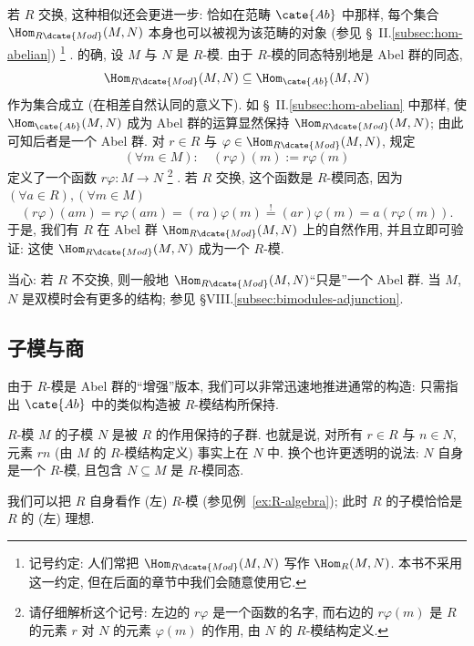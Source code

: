 若 $R$ 交换, 这种相似还会更进一步: 恰如在范畴 $\cate{Ab}$ 中那样, 每个集合 $\Hom_{R\dcate{Mod}}(M, N)$ 本身也可以被视为该范畴的对象 (参见 \S~II.\ref{subsec:hom-abelian})%
\footnote{记号约定: 人们常把 $\Hom_{R\dcate{Mod}}(M, N)$ 写作 $\Hom_R(M, N)$. 本书不采用这一约定, 但在后面的章节中我们会随意使用它.}%
. 的确, 设 $M$ 与 $N$ 是 $R$-模. 由于 $R$-模的同态特别地是 Abel 群的同态,
\[
\Hom_{R\dcate{Mod}}(M, N) \subseteq \Hom_{\cate{Ab}}(M, N)
\]
作为集合成立 (在相差自然认同的意义下). 如 \S~II.\ref{subsec:hom-abelian} 中那样, 使 $\Hom_{\cate{Ab}}(M, N)$ 成为 Abel 群的运算显然保持 $\Hom_{R\dcate{Mod}}(M, N)$; 由此可知后者是一个 Abel 群. 对 $r \in R$ 与 $\varphi \in \Hom_{R\dcate{Mod}}(M, N)$, 规定
\[
(\forall m \in M): \quad (r\varphi)(m) := r\varphi(m)
\]
定义了一个函数 $r\varphi : M \to N$%
\footnote{请仔细解析这个记号: 左边的 $r\varphi$ 是一个函数的名字, 而右边的 $r\varphi(m)$ 是 $R$ 的元素 $r$ 对 $N$ 的元素 $\varphi(m)$ 的作用, 由 $N$ 的 $R$-模结构定义.}%
. 若 $R$ 交换, 这个函数是 $R$-模同态, 因为 $(\forall a \in R), (\forall m \in M)$
\[
(r\varphi)(am) = r\varphi(am) = (ra)\varphi(m) \overset{!}{=} (ar)\varphi(m) = a(r\varphi(m)).
\]
于是, 我们有 $R$ 在 Abel 群 $\Hom_{R\dcate{Mod}}(M, N)$ 上的自然作用, 并且立即可验证: 这使 $\Hom_{R\dcate{Mod}}(M, N)$ 成为一个 $R$-模.

当心: 若 $R$ 不交换, 则一般地 $\Hom_{R\dcate{Mod}}(M, N)$``只是''一个 Abel 群. 当 $M$, $N$ 是双模时会有更多的结构; 参见 \S VIII.\ref{subsec:bimodules-adjunction}.

\subsection{子模与商}
\label{subsec:submodules}

由于 $R$-模是 Abel 群的``增强''版本, 我们可以非常迅速地推进通常的构造: 只需指出 $\cate{Ab}$ 中的类似构造被 $R$-模结构所保持.

$R$-模 $M$ 的子模%
$N$ 是被 $R$ 的作用保持的子群. 也就是说, 对所有 $r \in R$ 与 $n \in N$, 元素 $rn$ (由 $M$ 的 $R$-模结构定义) 事实上在 $N$ 中. 换个也许更透明的说法: $N$ 自身是一个 $R$-模, 且包含 $N \subseteq M$ 是 $R$-模同态.

\begin{example}
\label{ex:R-as-module}
我们可以把 $R$ 自身看作 (左) $R$-模 (参见例~\ref{ex:R-algebra}); 此时 $R$ 的子模恰恰是 $R$ 的 (左) 理想.
\end{example}

